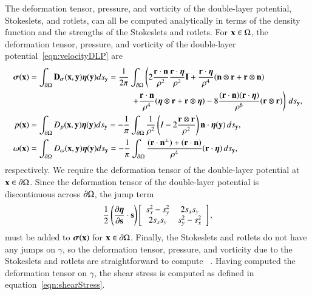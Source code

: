 \documentclass[preprint, 10pt]{elsarticle}
\begin{document}
The deformation tensor, pressure, and vorticity of the double-layer
potential, Stokeslets, and rotlets, can all be computed analytically in
terms of the density function and the strengths of the Stokeslets and
rotlets.  For ${\mathbf{x}} \in \Omega$, the deformation tensor, pressure, and
vorticity of the double-layer potential~\eqref{eqn:velocityDLP} are
\begin{align}
  \label{eqn:deformationDLP} 
  \ssigma(\xx) &= \int_{\bd\Omega} \mathbf{D}_{\ssigma}(\xx,\yy) 
      \eeta(\yy) ds_{\yy} 
  = \frac{1}{2\pi}\int_{\bd\Omega} \left(
    2\frac{\rr \cdot \nn}{\rho^2} \frac{\rr \cdot \eeta}{\rho^2} \II + 
    \frac{\rr \cdot \eeta}{\rho^4} (\nn \otimes \rr + \rr \otimes \nn) 
    \right. \nonumber \\
    & \qquad\qquad\qquad\qquad\qquad\qquad \left.
    +\frac{\rr \cdot \nn}{\rho^4} (\eeta \otimes \rr + \rr \otimes \eeta) - 
    8\frac{(\rr \cdot \nn)(\rr \cdot \eeta)}{\rho^6}(\rr \otimes \rr)
    \right) \, ds_\yy, \\
%
  p(\xx) &= \int_{\bd\Omega} D_{p}(\xx,\yy) 
      \eeta(\yy) ds_{\yy} 
  = -\frac{1}{\pi}\int_{\bd\Omega} \frac{1}{\rho^2}
    \left(I - 2 \frac{\rr \otimes \rr}{\rho^2}\right) \nn \cdot
      \eeta(\yy)\,ds_\yy, \\
%
  \label{eqn:vorticityDLP} 
  \omega(\xx) &= \int_{\bd\Omega} D_{\omega}(\xx,\yy) 
      \eeta(\yy) ds_{\yy} 
  = -\frac{1}{\pi} \int_{\bd\Omega}
    \frac{(\rr \cdot \nn^\perp) + (\rr \cdot \nn)}{\rho^4} 
      (\rr \cdot \eeta) \, ds_\yy,
\end{align}
respectively. We require the deformation tensor of the double-layer potential at
${\mathbf{x}} \in {\partial} \Omega$.  Since the deformation tensor of the double-layer
potential is discontinuous across ${\partial}\Omega$, the jump term 
\begin{align}
  \frac{1}{2} \left(\frac{\partial {\boldsymbol\eta}}{\partial {\mathbf{s}}} \cdot {\mathbf{s}} \right) \left[
    \begin{array}{cc}
      s_x^2 - s_y^2 & 2s_x s_y \\ 2s_x s_y & s_y^2 - s_x^2
    \end{array}
  \right],
  \label{eqn:deformationJump}
\end{align}
must be added to ${\boldsymbol\sigma}({\mathbf{x}})$ for ${\mathbf{x}} \in {\partial}\Omega$.  Finally, the
Stokeslets and rotlets do not have any jumps on $\gamma$, so the
deformation tensor, pressure, and vorticity due to the Stokeslets and
rotlets are straightforward to compute~\cite{poz1992} .  Having computed the deformation
tensor on $\gamma$, the shear stress is computed as defined in
equation~\eqref{eqn:shearStress}.  
\end{document}
